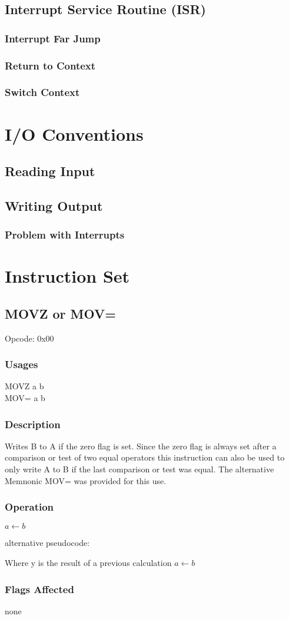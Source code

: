 \documentclass[oneside, a4paper]{memoir}
\newcommand{\instruction}[6]{
\section*{#1} %
Opcode: #2
\subsection{Usages}
#3
\subsection{Description}
#4
\subsection{Operation}
#5
\subsection{Flags Affected}
#6
\clearpage
}
\begin{document}
\section{Interrupt Service Routine (ISR)}
\subsection{Interrupt Far Jump}
\subsection{Return to Context}
\subsection{Switch Context}

\chapter{I/O Conventions}
\label{ch:I/O Conventions}
\section{Reading Input}
\section{Writing Output}
\subsection{Problem with Interrupts}

\chapter{Instruction Set}
\clearpage
\instruction{MOVZ or MOV=}{0x00}{
MOVZ a b \\
MOV= a b
}{
Writes B to A if the zero flag is set. Since the zero flag is always set after a comparison or test of two equal operators this instruction can also be used to only write A to B if the last comparison or test was equal. The alternative Memnonic MOV= was provided for this use.
}{
\begin{algorithmic}
\If {$Z$}
    \State $a\gets b$
\EndIf
\end{algorithmic}
alternative pseudocode:
\begin{algorithmic}
\If {$y = 0$} \Comment Where y is the result of a previous calculation
    \State $a\gets b$
\EndIf
\end{algorithmic}
}{none}
\end{document}
